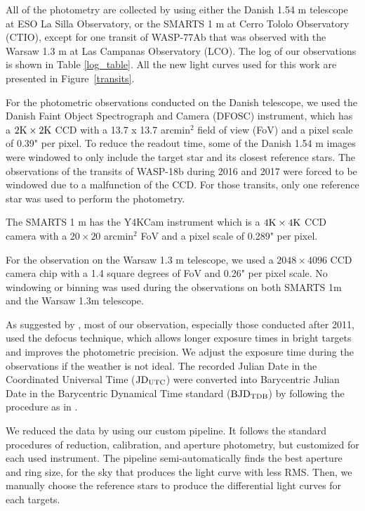 All of the photometry are collected by using either the Danish 1.54 m telescope at ESO La Silla Observatory, or the SMARTS 1 m at Cerro Tololo Observatory (CTIO), except for one transit of WASP-77Ab that was observed with the Warsaw 1.3 m at Las Campanas Observatory (LCO). The log of our observations is shown in Table \ref{log_table}. All the new light curves used for this work are presented in Figure~\ref{transits}.

For the photometric observations conducted on the Danish telescope, we used the Danish Faint Object Spectrograph and Camera (DFOSC) instrument, which has a $2{\rm K} \times 2{\rm K}$ CCD with a 13.7 x 13.7 arcmin$^2$ field of view (FoV) and a pixel scale of 0.39" per pixel. To reduce the readout time, some of the Danish 1.54 m images were windowed to only include the target star and its closest reference stars. The observations of the transits of WASP-18b during 2016 and 2017 were forced to be windowed due to a malfunction of the CCD. For those transits, only one reference star was used to perform the photometry.

The SMARTS 1 m has the Y4KCam instrument which is a $4{\rm K} \times 4{\rm K}$ CCD camera with a $20\times20$ arcmin$^2$ FoV and a pixel scale of 0.289" per pixel. 

For the observation on the Warsaw 1.3 m telescope, we used a $2048 \times 4096$ CCD camera chip with a 1.4 square degrees of FoV and 0.26" per pixel scale. No windowing or binning was used during the observations on both SMARTS 1m and the Warsaw 1.3m telescope.

As suggested by \cite{Southworth2009}, most of our observation, especially those conducted after 2011, used the defocus technique, which allows longer exposure times in bright targets and improves the photometric precision. We adjust the exposure time during the observations if the weather is not ideal. The recorded Julian Date in the Coordinated Universal Time (${\rm JD_{UTC}}$) were converted into Barycentric Julian Date in the Barycentric Dynamical Time standard (${\rm BJD_{TDB}}$) by following the procedure as in \citet{Eastman2010}.

We reduced the data by using our custom pipeline. It follows the standard procedures of reduction, calibration, and aperture photometry, but customized for each used instrument. The pipeline semi-automatically finds the best aperture and ring size, for the sky that produces the light curve with less RMS. Then, we manually choose the reference stars to produce the differential light curves for each targets.


